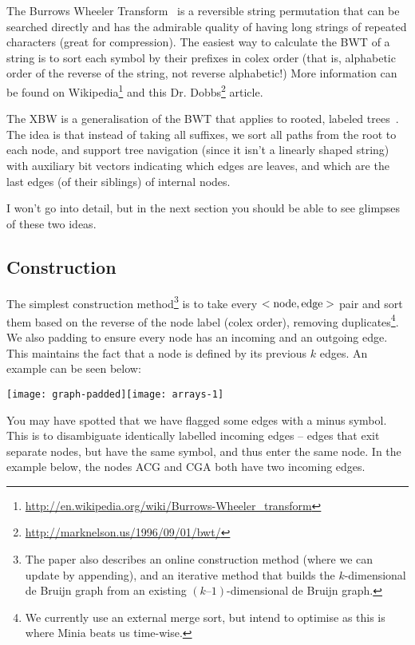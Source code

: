The Burrows Wheeler Transform~\cite{BW94} is a reversible string permutation that can be searched directly and has the admirable quality of having long strings of repeated characters (great for compression). The easiest way to calculate the BWT of a string is to sort each symbol by their prefixes in colex order (that is, alphabetic order of the reverse of the string, not reverse alphabetic!) More information can be found on Wikipedia\footnote{\url{http://en.wikipedia.org/wiki/Burrows-Wheeler_transform}} and this Dr. Dobbs\footnote{\url{http://marknelson.us/1996/09/01/bwt/}} article.

The XBW is a generalisation of the BWT that applies to rooted, labeled trees~\cite{FLMM09}. The idea is that instead of taking all suffixes, we sort all paths from the root to each node, and support tree navigation (since it isn't a linearly shaped string) with auxiliary bit vectors indicating which edges are leaves, and which are the last edges (of their siblings) of internal nodes.

I won't go into detail, but in the next section you should be able to see glimpses of these two ideas.

\subsection{Construction}\label{bl-sec:con}

The simplest construction method\footnote{The paper also describes an online construction method (where we can update by appending), and an iterative method that builds the $k$-dimensional de Bruijn graph from an existing $(k–1)$-dimensional de Bruijn graph.} is to take every $<\rm node, edge>$ pair and sort them based on the reverse of the node label (colex order), removing duplicates\footnote{We currently use an external merge sort, but intend to optimise as this is where Minia beats us time-wise.}. We also padding to ensure every node has an incoming and an outgoing edge. This maintains the fact that a node is defined by its previous $k$ edges. An example can be seen below:

\medskip\centerline{\texttt{[image: graph-padded]}\hfill\texttt{[image: arrays-1]}}\medskip
 
You may have spotted that we have flagged some edges with a minus symbol. This is to disambiguate identically labelled incoming edges -- edges that exit separate nodes, but have the same symbol, and thus enter the same node. In the example below, the nodes ACG and CGA both have two incoming edges.

